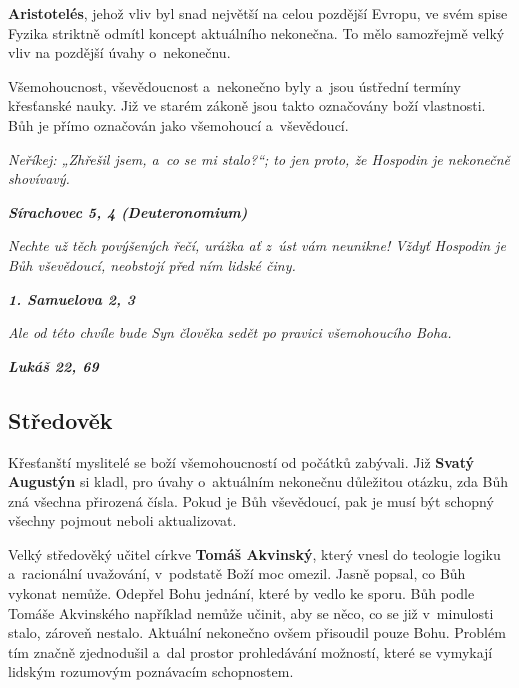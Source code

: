 \documentclass[czech]{article}
\begin{document}
\textbf{Aristotelés}, jehož vliv byl snad největší na celou pozdější Evropu, ve svém spise Fyzika striktně odmítl koncept aktuálního nekonečna. \cite{aristoteles_fyzika} To mělo samozřejmě velký vliv na pozdější úvahy o~nekonečnu.

Všemohoucnost, vševědoucnost a~nekonečno byly a~jsou ústřední termíny křesťanské nauky.
Již ve starém zákoně jsou takto označovány boží vlastnosti. 
Bůh je přímo označován jako všemohoucí a~vševědoucí.

\begin{center}
\textit{Neříkej: „Zhřešil jsem, a~co se mi stalo?“; to jen proto, že Hospodin je nekonečně shovívavý.}

\textit{\textbf{Sírachovec 5, 4 (Deuteronomium)}}
\end{center}

\begin{center}
\textit{Nechte už těch povýšených řečí, urážka ať z~úst vám neunikne! Vždyť Hospodin je Bůh vševědoucí, neobstojí před ním lidské činy.}

\textit{\textbf{1. Samuelova 2, 3}}
\end{center}

\begin{center}
\textit{Ale od této chvíle bude Syn člověka sedět po pravici všemohoucího Boha.}

\textit{\textbf{Lukáš 22, 69}}
\end{center}

\subsection*{Středověk}

Křesťanští myslitelé se boží všemohoucností od počátků zabývali.
Již \textbf{Svatý Augustýn} si kladl, pro úvahy o~aktuálním nekonečnu důležitou otázku, zda Bůh zná všechna přirozená čísla. Pokud je Bůh vševědoucí, pak je musí být schopný všechny pojmout neboli aktualizovat.

Velký středověký učitel církve \textbf{Tomáš Akvinský}, který vnesl do teologie logiku a~racionální uvažování, v~podstatě Boží moc omezil. Jasně popsal, co Bůh vykonat nemůže. Odepřel Bohu jednání, které by vedlo ke sporu. Bůh podle Tomáše Akvinského například nemůže učinit, aby se něco, co se již v~minulosti stalo, zároveň nestalo.
Aktuální nekonečno ovšem přisoudil pouze Bohu. Problém tím značně zjednodušil a~dal prostor prohledávání možností, které se vymykají lidským rozumovým poznávacím schopnostem. \cite{vopenka_infinitni_mateatika}
\end{document}
